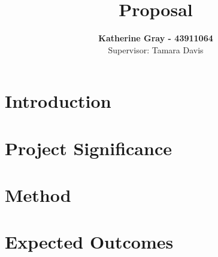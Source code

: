 \documentclass[pra, reprint, A4 paper, bibnotes]{revtex4-1}
\begin{document}
\title{Proposal}
\author{\textbf{Katherine Gray - 43911064}\\ Supervisor: Tamara Davis}

\maketitle %
\thispagestyle{fancy} %
\pagebreak
\section{Introduction}
\section{Project Significance}
\section{Method}
\section{Expected Outcomes}


\end{document}
